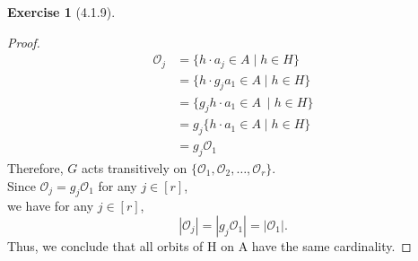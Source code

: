 \documentclass{amsart}
\theoremstyle{plain}
\theoremstyle{definition}
\newtheorem{exer}[lem]{Exercise}
\newcommand{\OO}[1]{\mathcal{O}_{#1}}
\begin{document}
\begin{exer}[4.1.9]
\begin{enumerate}[(a)]
\begin{proof}
\begin{align*}
  		\OO j &= \{h\cdot a_j \in A \mid h\in H\} \\
			  &= \{h \cdot g_ja_1 \in A \mid h \in H \}\\
	    	  &= \{g_j h \cdot a_1 \in A\ \mid h \in H \}\\
			  &=g_j \{h\cdot a_1\in A \mid h\in H\} \\
	          &=g_j \OO 1
  \end{align*}
 Therefore, $G$ acts transitively on $\{\OO 1,\OO 2,\ldots,\OO r\}$.\\
 Since $\OO j = g_j \OO 1$ for any $j \in [r]$,\\
 we have for any $j \in [r]$,
 \[|\OO j| = |g_j \OO 1| = |\OO1|.\]
 Thus, we conclude that all orbits of H on A have the same cardinality.
\end{proof}



\end{enumerate}
\end{exer}
\end{document}
